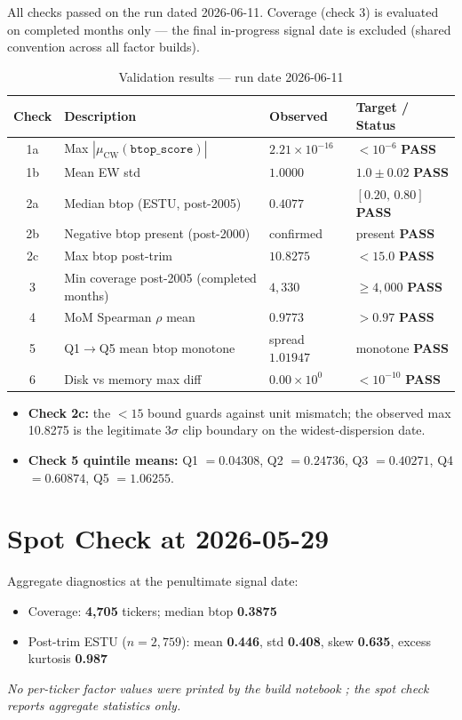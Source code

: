 \documentclass[11pt,a4paper]{article}
\newcommand{\PASS}[1]{\textcolor{pass}{\textbf{#1}}}
\newcommand{\NOTE}[1]{\textcolor{note}{\textit{#1}}}
\begin{document}
All checks passed on the run dated 2026-06-11. Coverage (check 3) is evaluated
on completed months only --- the final in-progress signal date is excluded
(shared convention across all factor builds).

\begin{table}[h!]
\centering
\caption{Validation results --- run date 2026-06-11}
\small
\begin{tabular}{clll}
\toprule
\textbf{Check} & \textbf{Description} & \textbf{Observed} & \textbf{Target / Status} \\
\midrule
1a & Max $|\mu_{\text{CW}}(\texttt{btop\_score})|$ & $2.21\times10^{-16}$ & $<10^{-6}$ \quad \PASS{PASS} \\
1b & Mean EW std & $1.0000$ & $1.0\pm0.02$ \quad \PASS{PASS} \\
2a & Median btop (ESTU, post-2005) & $0.4077$ & $[0.20,\,0.80]$ \quad \PASS{PASS} \\
2b & Negative btop present (post-2000) & confirmed & present \quad \PASS{PASS} \\
2c & Max btop post-trim & $10.8275$ & $<15.0$ \quad \PASS{PASS} \\
3 & Min coverage post-2005 (completed months) & $4{,}330$ & $\geq4{,}000$ \quad \PASS{PASS} \\
4 & MoM Spearman $\rho$ mean & $0.9773$ & $>0.97$ \quad \PASS{PASS} \\
5 & Q1$\to$Q5 mean btop monotone & spread $1.01947$ & monotone \quad \PASS{PASS} \\
6 & Disk vs memory max diff & $0.00\times10^{0}$ & $<10^{-10}$ \quad \PASS{PASS} \\
\bottomrule
\end{tabular}
\end{table}

\begin{itemize}[leftmargin=*,topsep=2pt,itemsep=2pt]
  \item \textbf{Check 2c:} the $<15$ bound guards against unit mismatch; the observed max 10.8275 is the legitimate 3$\sigma$ clip boundary on the widest-dispersion date.
  \item \textbf{Check 5 quintile means:} Q1 $=0.04308$, Q2 $=0.24736$, Q3 $=0.40271$, Q4 $=0.60874$, Q5 $=1.06255$.
\end{itemize}

\section{Spot Check at 2026-05-29}

Aggregate diagnostics at the penultimate signal date:

\begin{itemize}[leftmargin=*,topsep=2pt,itemsep=2pt]
  \item Coverage: \textbf{4{,}705} tickers; median btop \textbf{0.3875}
  \item Post-trim ESTU ($n=2{,}759$): mean \textbf{0.446}, std \textbf{0.408}, skew \textbf{0.635}, excess kurtosis \textbf{0.987}
\end{itemize}

\NOTE{No per-ticker factor values were printed by the build notebook
; the spot check reports aggregate statistics only.}
\end{document}
